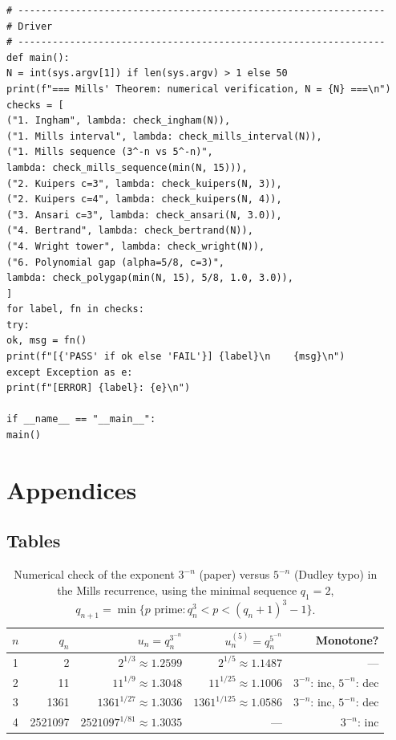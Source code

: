 \documentclass[11pt,reqno]{amsart}
\theoremstyle{blueplain}
\numberwithin{equation}{section}
\begin{document}
\begin{lstlisting}[style=python]
# ----------------------------------------------------------------
# Driver
# ----------------------------------------------------------------
def main():
N = int(sys.argv[1]) if len(sys.argv) > 1 else 50
print(f"=== Mills' Theorem: numerical verification, N = {N} ===\n")
checks = [
("1. Ingham", lambda: check_ingham(N)),
("1. Mills interval", lambda: check_mills_interval(N)),
("1. Mills sequence (3^-n vs 5^-n)",
lambda: check_mills_sequence(min(N, 15))),
("2. Kuipers c=3", lambda: check_kuipers(N, 3)),
("2. Kuipers c=4", lambda: check_kuipers(N, 4)),
("3. Ansari c=3", lambda: check_ansari(N, 3.0)),
("4. Bertrand", lambda: check_bertrand(N)),
("4. Wright tower", lambda: check_wright(N)),
("6. Polynomial gap (alpha=5/8, c=3)",
lambda: check_polygap(min(N, 15), 5/8, 1.0, 3.0)),
]
for label, fn in checks:
try:
ok, msg = fn()
print(f"[{'PASS' if ok else 'FAIL'}] {label}\n    {msg}\n")
except Exception as e:
print(f"[ERROR] {label}: {e}\n")

if __name__ == "__main__":
main()
\end{lstlisting}

\section{Appendices}
\label{sec:appendix}

\subsection{Tables}
\label{sec:appendix-tables}

\begin{table}[H]
	\centering
	\caption{Numerical check of the exponent \(3^{-n}\) (paper) versus \(5^{-n}\)
		(Dudley typo) in the Mills recurrence, using the minimal sequence
		\(q_1=2\), \(q_{n+1}=\min\{p\text{ prime}: q_n^3<p<(q_n+1)^3-1\}\).}
	\label{tab:exponent-typo}
	{\small
		\begin{tabular}{|c|r|r|r|r|}
			\hline
			\(n\) & \(q_n\) & \(u_n=q_n^{3^{-n}}\) & \(u_n^{(5)}=q_n^{5^{-n}}\)
			& Monotone? \\
			\hline
			1 & 2 & \(2^{1/3}\approx 1.2599\) & \(2^{1/5}\approx 1.1487\) & --- \\
			2 & 11 & \(11^{1/9}\approx 1.3048\) & \(11^{1/25}\approx 1.1006\) &
			\(3^{-n}\): inc, \(5^{-n}\): dec \\
			3 & 1361 & \(1361^{1/27}\approx 1.3036\) & \(1361^{1/125}\approx 1.0586\) &
			\(3^{-n}\): inc, \(5^{-n}\): dec \\
			4 & 2521097 & \(2521097^{1/81}\approx 1.3035\) & --- &
			\(3^{-n}\): inc \\
			\hline
		\end{tabular}
	}
\end{table}
\end{document}
